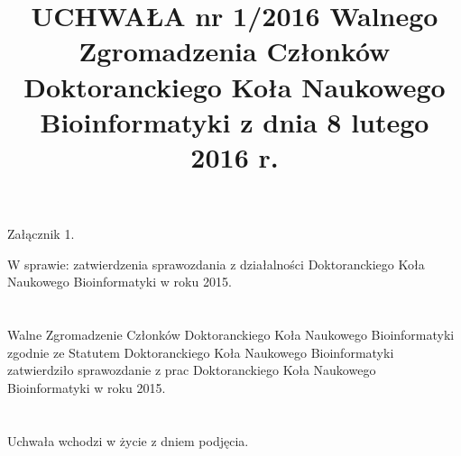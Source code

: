 \documentclass{article}
\title{UCHWAŁA nr 1/2016 Walnego Zgromadzenia Członków Doktoranckiego Koła Naukowego Bioinformatyki z dnia 8 lutego 2016 r.}
\date{}
\begin{document}
\hfill Załącznik 1.
{\let\newpage\relax\maketitle}


\maketitle

W sprawie: zatwierdzenia sprawozdania z działalności Doktoranckiego Koła Naukowego Bioinformatyki w roku 2015.

\section{}

Walne Zgromadzenie Członków Doktoranckiego Koła Naukowego Bioinformatyki zgodnie ze Statutem Doktoranckiego Koła Naukowego Bioinformatyki zatwierdziło sprawozdanie z prac Doktoranckiego Koła Naukowego Bioinformatyki w roku 2015.
  
\section{}
Uchwała wchodzi w życie z dniem podjęcia.
\end{document}
